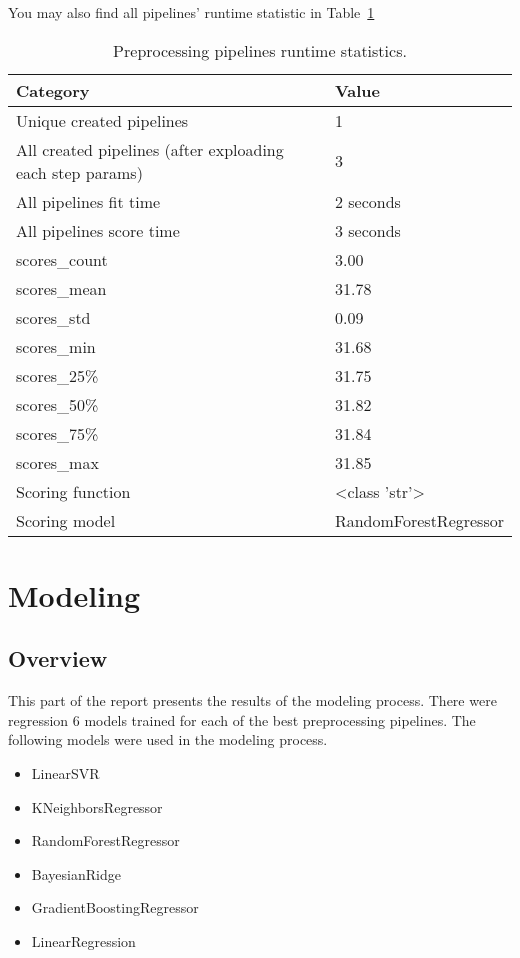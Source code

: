 \documentclass{article}%
\begin{document}
%
You may also find all pipelines' runtime statistic in %
Table~\ref{tab:preprocessing_pipelines_runtime_statistics}%


\begin{table}[H]%
\begin{center}%
\renewcommand{\arraystretch}{1.5}%
\begin{tabular}{l l}%
\hline%
\textbf{Category}&\textbf{Value}\\%
\hline%
Unique created pipelines&1\\%
All created pipelines (after exploading each step params)&3\\%
All pipelines fit time&2 seconds\\%
All pipelines score time&3 seconds\\%
scores\_count&3.00\\%
scores\_mean&31.78\\%
scores\_std&0.09\\%
scores\_min&31.68\\%
scores\_25\%&31.75\\%
scores\_50\%&31.82\\%
scores\_75\%&31.84\\%
scores\_max&31.85\\%
Scoring function&<class 'str'>\\%
Scoring model&RandomForestRegressor\\%
\hline%
\end{tabular}%
\end{center}%
\caption{Preprocessing pipelines runtime statistics.}%
\label{tab:preprocessing_pipelines_runtime_statistics}%
\end{table}

%
\section{Modeling}%
\label{sec:Modeling}%

%
\subsection{Overview}%
\label{subsec:Overview}%

%
This part of the report presents the results of the modeling process. There were regression 6 models trained for each of the best preprocessing pipelines.%
The following models were used in the modeling process.%
\begin{itemize}%
\item%
LinearSVR%
\item%
KNeighborsRegressor%
\item%
RandomForestRegressor%
\item%
BayesianRidge%
\item%
GradientBoostingRegressor%
\item%
LinearRegression%
\end{itemize}%
\end{document}
